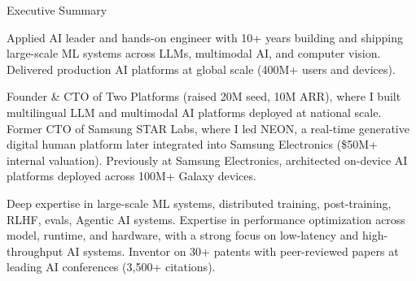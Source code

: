 \documentclass[
	10pt, %
]{resume} %
\begin{document}


\begin{rSection}{Executive Summary}

Applied AI leader and hands-on engineer with 10+ years building and shipping large-scale ML systems across LLMs, multimodal AI, and computer vision. Delivered production AI platforms at global scale (400M+ users and devices).


Founder \& CTO of Two Platforms (raised 20M seed, 10M ARR), where I built multilingual LLM and multimodal AI platforms deployed at national scale. Former CTO of Samsung STAR Labs, where I led NEON, a real-time generative digital human platform later integrated into Samsung Electronics (\$50M+ internal valuation). Previously at Samsung Electronics, architected on-device AI platforms deployed across 100M+ Galaxy devices.

Deep expertise in large-scale ML systems, distributed training, post-training, RLHF, evals, Agentic AI systems. Expertise in performance optimization across model, runtime, and hardware, with a strong focus on low-latency and high-throughput AI systems. Inventor on 30+ patents with peer-reviewed papers at leading AI conferences (3,500+ citations).


\end{rSection}
\end{document}
